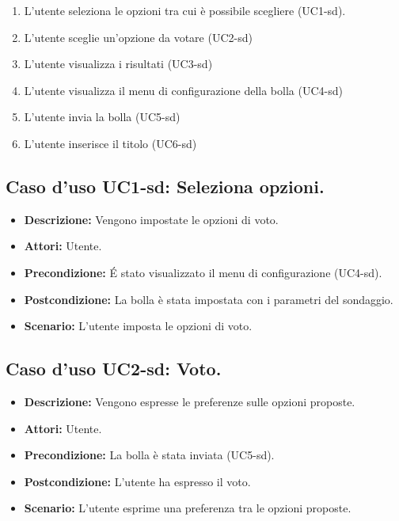 \begin{itemize}
\begin{enumerate}
\item L'utente seleziona le opzioni tra cui è possibile scegliere (UC1-sd).


\item L'utente sceglie un'opzione da votare (UC2-sd)
\item L'utente visualizza i risultati (UC3-sd)
\item L'utente visualizza il menu di configurazione della bolla (UC4-sd)
\item L'utente invia la bolla (UC5-sd)
\item L'utente inserisce il titolo (UC6-sd)
\end{enumerate} 
\end{itemize}

\subsection{Caso d'uso UC1-sd: Seleziona opzioni.}
\begin{itemize}
\item[]\textbf{Descrizione:} Vengono impostate le opzioni di voto.
\item[]\textbf{Attori:} Utente. 
\item[]\textbf{Precondizione:} \'E stato visualizzato il menu di configurazione (UC4-sd). 
\item[]\textbf{Postcondizione:} La bolla è stata impostata con i parametri del sondaggio. 
\item[]\textbf{Scenario:}
L'utente imposta le opzioni di voto. 
\end{itemize}

\subsection{Caso d'uso UC2-sd: Voto.}
\begin{itemize}
\item[]\textbf{Descrizione:} Vengono espresse le preferenze sulle opzioni proposte.
\item[]\textbf{Attori:} Utente. 
\item[]\textbf{Precondizione:} La bolla è stata inviata (UC5-sd). 
\item[]\textbf{Postcondizione:} L'utente ha espresso il voto. 
\item[]\textbf{Scenario:}
L'utente esprime una preferenza tra le opzioni proposte. 
\end{itemize}

